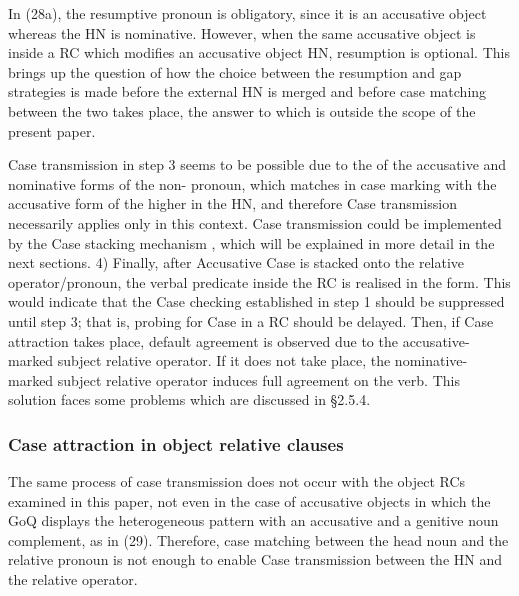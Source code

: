 \documentclass[output=paper]{langsci/langscibook}
\begin{document}
In (28a), the resumptive pronoun is obligatory, since it is an accusative object whereas the HN is nominative. However, when the same accusative object is inside a RC which modifies an accusative object HN, resumption is optional. This brings up the question of how the choice between the resumption and gap strategies is made before the external HN is merged and before case matching between the two takes place, the answer to which is outside the scope of the present paper. 

Case transmission in step 3 seems to be possible due to the  of the accusative and nominative forms of the non- pronoun, which matches in case marking with the accusative form of the higher  in the HN, and therefore Case transmission necessarily applies only in this context. Case transmission could be implemented by the Case stacking mechanism \citep{Vogel2001}, which will be explained in more detail in the next sections. 4) Finally, after Accusative Case is stacked onto the relative operator\slash pronoun, the verbal predicate inside the RC is realised in the  form. This would indicate that the Case checking established in step 1 should be suppressed until step 3; that is, probing for Case in a RC should be delayed. Then, if Case attraction takes place, default agreement is observed due to the accusative-marked subject relative operator. If it does not take place, the nominative-marked subject relative operator induces full agreement on the verb. This solution faces some problems which are discussed in §2.5.4.

\subsubsection{Case attraction in object relative clauses}%

The same process of case transmission does not occur with the object RCs examined in this paper, not even in the case of accusative objects in which the GoQ displays the heterogeneous pattern with an accusative  and a genitive noun complement, as in (29). Therefore, case matching between the head noun and the relative pronoun is not enough to enable Case transmission between the HN and the relative operator.
\end{document}
